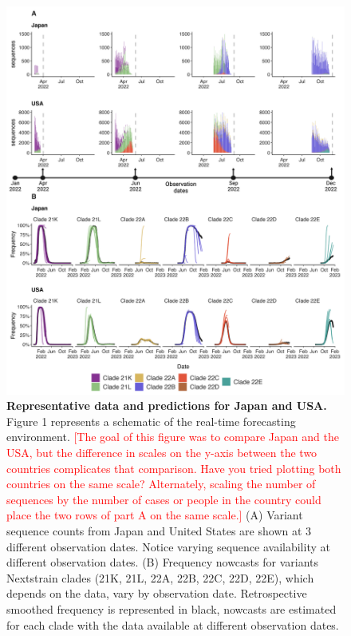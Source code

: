 \documentclass[11pt,oneside,letterpaper]{article}
\def\jhc#1{\textcolor{red}{[#1]}}
\begin{document}
\begin{figure}[H]
	\centering
	\includegraphics[width=0.8\textwidth=0.01]{figures/Dynamic_est_env.png}
	\caption{\textbf{Representative data and predictions for Japan and USA.}
    Figure 1 represents a schematic of the real-time forecasting environment.
    \jhc{The goal of this figure was to compare Japan and the USA, but the difference in scales on the y-axis between the two countries complicates that comparison. Have you tried plotting both countries on the same scale? Alternately, scaling the number of sequences by the number of cases or people in the country could place the two rows of part A on the same scale.}
	(A) Variant sequence counts from Japan and United States are shown at 3 different observation dates.
	Notice varying sequence availability at different observation dates.
	(B) Frequency nowcasts for variants Nextstrain clades (21K, 21L, 22A, 22B, 22C, 22D, 22E), which depends on the data, vary by observation date. 
	Retrospective smoothed frequency is represented in black, nowcasts are estimated for each clade with the data available at different observation dates. }
	\label{fig:dynamic_forecast_env}
\end{figure}
\end{document}
